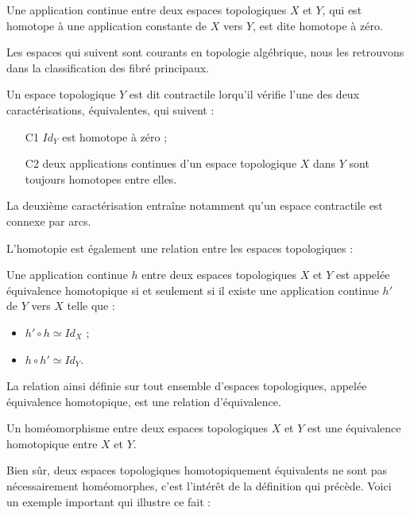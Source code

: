 \begin{defi}
Une application continue entre deux espaces topologiques $X$ et $Y$, qui est homotope \`a une application constante de $X$ vers $Y$, %
est dite homotope \`a z\'ero.
\end{defi}

Les espaces qui suivent sont courants en topologie alg\'ebrique, nous les retrouvons dans la classification des fibr\'e principaux.

\begin{prefi}
Un espace topologique $Y$ est dit contractile lorqu'il v\'erifie l'une des deux caract\'erisations, \'equivalentes, qui suivent :
\begin{itemize}
\item[C1] $Id_Y$ est homotope \`a z\'ero ;
\item[C2] deux applications continues d'un espace topologique $X$ dans $Y$ sont toujours homotopes entre elles.
\end{itemize}
\end{prefi}

La deuxi\`eme caract\'erisation entra\^ine notamment qu'un espace contractile est connexe par arcs.

\par
L'homotopie est \'egalement une relation entre les espaces topologiques :

\begin{defi}
Une application continue $h$ entre deux espaces topologiques $X$ et $Y$ est appel\'ee \'equivalence homotopique si et seulement si %
il existe une application continue $h'$ de $Y$ vers $X$ telle que :
\begin{itemize}
\item $h'\circ h\simeq Id_X$ ;
\item $h\circ h'\simeq Id_Y$.
\end{itemize}
La relation ainsi d\'efinie sur tout ensemble d'espaces topologiques, appel\'ee \'equivalence homotopique, est une relation d'\'equivalence.
\end{defi}

\begin{exem}
Un hom\'eomorphisme entre deux espaces topologiques $X$ et $Y$ est une \'equivalence homotopique entre $X$ et $Y$.
\end{exem}

Bien s\^ur, deux espaces topologiques homotopiquement \'equivalents ne sont pas n\'ecessairement hom\'eomorphes, c'est l'int\'er\^et de la d\'efinition qui pr\'ec\`ede. %
Voici un exemple important qui illustre ce fait :

